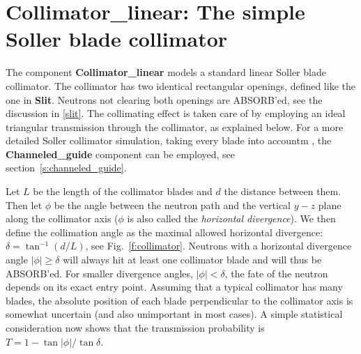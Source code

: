 \section{Collimator\_linear: The simple Soller blade collimator}
\label{collimator-linear}


The component {\bf Collimator\_linear}
models a standard linear Soller blade collimator.
The collimator has two identical rectangular openings,
defined like the one in {\bf Slit}. Neutrons not clearing both
openings are ABSORB'ed, see the discussion in \ref{slit}.
The collimating effect is taken care of by employing an ideal
triangular transmission through the collimator, as explained below.
For a more detailed Soller collimator simulation,
taking every blade into accountm , the {\bf Channeled\_guide}
component can be employed, see section~\ref{s:channeled_guide}.

Let $L$ be the length of the collimator blades
and $d$ the distance between them.
Then let $\phi$ be the angle between the
neutron path and the vertical $y-z$ plane along the collimator axis
($\phi$ is also called the {\em horizontal divergence}).
We then define the collimation angle as the maximal allowed
horizontal divergence: $\delta = \tan^{-1}(d/L)$,
see Fig.~\ref{f:collimator}. Neutrons with a horizontal
divergence angle $|\phi| \geq \delta$ will always
hit at least one collimator blade and will thus be ABSORB'ed.
For smaller divergence angles, $|\phi| < \delta$, the fate of the
neutron depends on its exact entry point.
Assuming that a typical collimator has many blades, the
absolute position of each blade perpendicular to the collimator axis
is somewhat uncertain (and also unimportant in most cases).
A simple statistical consideration now shows that the transmission
probability is $T = 1-\tan|\phi|/\tan\delta$.


